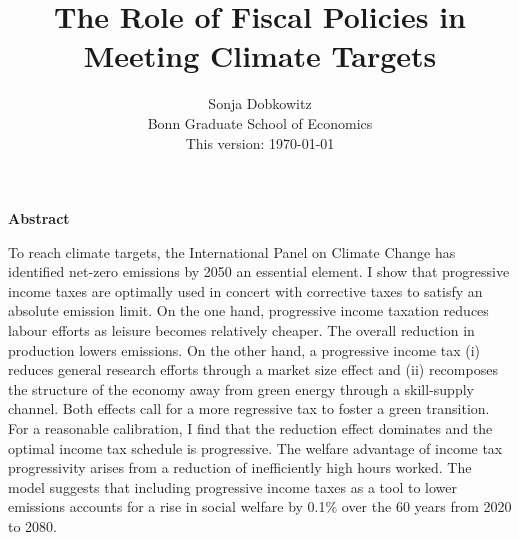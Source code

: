 \documentclass[12pt]{article}
\title{The Role of Fiscal Policies in Meeting Climate Targets}
\date{Sonja Dobkowitz\\ Bonn Graduate School of Economics\\ %
\vspace{1mm}
This version: \today }
\renewenvironment{abstract}
{\small
	\list{}{
		\setlength{\leftmargin}{0.025\textwidth}%
		\setlength{\rightmargin}{\leftmargin}%
	}%
	\item\relax}
{\endlist}
\begin{document}
%	
	\maketitle
	\begin{abstract}
		\begin{singlespacing}
			\textbf{Abstract \ }
			
			To reach climate targets, the International Panel on Climate Change has identified net-zero emissions by 2050 an essential element. I show that progressive income taxes are optimally used in concert with corrective taxes to satisfy an absolute emission limit.
			On the one hand, progressive income taxation reduces labour efforts as leisure becomes relatively cheaper. The overall reduction in production lowers emissions. On the other hand, a progressive income tax (i) reduces general research efforts through a market size effect  and (ii) recomposes the structure of the economy away from green energy through a skill-supply channel. Both effects call for a more regressive tax to foster a green transition. For a reasonable calibration, I find that the reduction effect dominates and the optimal income tax schedule is progressive. The welfare advantage of income tax progressivity arises from a reduction of inefficiently high hours worked. The model suggests that including progressive income taxes as a tool to lower emissions accounts for a rise in social welfare by 0.1\% over the 60 years from 2020 to 2080.  %
			
		

\end{singlespacing}
\end{abstract}
\end{document}
